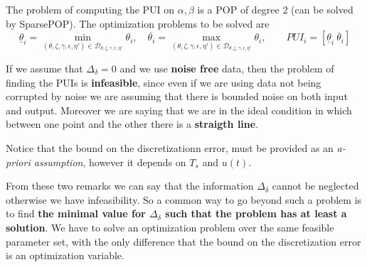 The problem of computing the PUI on $\alpha, \beta$ is a POP of degree 2 (can be solved by SparsePOP). The optimization problems to be solved are 
\begin{equation}
    \underline{\theta}_i=\min_{(\theta,\zeta,\gamma,\epsilon,\eta')\in\mathcal{D}_{\theta,\zeta,\gamma,\epsilon,\eta'}} \theta_i, \quad \overline{\theta_i}=\max_{(\theta,\zeta,\gamma,\epsilon,\eta')\in\mathcal{D}_{\theta,\zeta,\gamma,\epsilon,\eta'}} \theta_i, \qquad 
    PUI_i=[\underline{\theta}_i \ \overline{\theta}_i ]
\end{equation}

\begin{remark}
    If we assume that $\Delta_\delta=0$ and we use \textbf{noise free} data, then the problem of finding the PUIs is \textbf{infeasible}, since even if we are using data not being corrupted by noise we are assuming that there is bounded noise on both input and output. Moreover we are saying that we are in the ideal condition in which between one point and the other there is a \textbf{straigth line}.
\end{remark}

\begin{remark}
    Notice that the bound on the discretizationn error, must be provided as an \textit{a-priori assumption}, however it depends on $T_s$ and $u(t)$.
\end{remark}

From these two remarks we can say that the information $\Delta_\delta$ cannot be neglected otherwise we have infeasibility. So a common way to go beyond such a problem is to find \textbf{the minimal value for $\Delta_\delta$ such that the problem has at least a solution}. We have to solve an optimization problem over the same feasible parameter set, with the only difference that the bound on the discretization error is an optimization variable.


